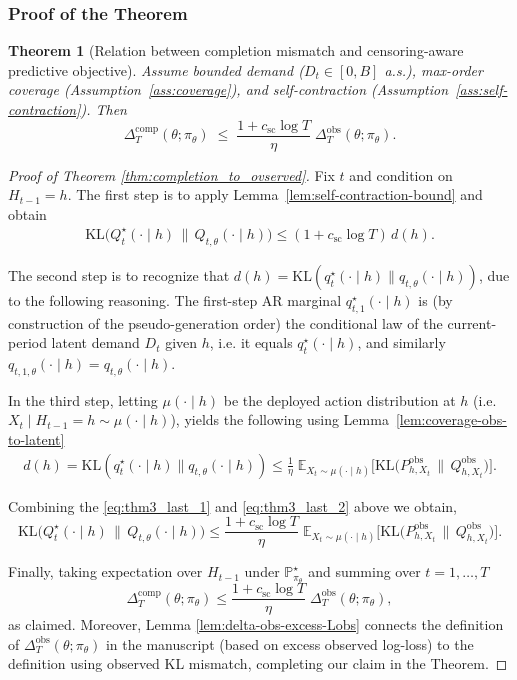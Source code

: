 \documentclass[11pt]{article}
\newtheorem*{theorem*}{Theorem}
\renewcommand{\P}{\mathbb{P}}
\begin{document}
\subsubsection{Proof of the Theorem}

\begin{theorem*}[Relation between completion mismatch and censoring-aware predictive objective]\label{thm:deploy-vs-obs}
Assume bounded demand ($D_t\in[0,B]$ a.s.), max-order coverage (Assumption~\ref{ass:coverage}),
and self-contraction (Assumption~\ref{ass:self-contraction}). Then
\[
\Delta^{\mathrm{comp}}_T(\theta;\pi_\theta)
\;\le\;
\frac{1+c_{\mathrm{sc}}\log T}{\eta}\;
\Delta^{\mathrm{obs}}_T(\theta;\pi_\theta).
\]
\end{theorem*}

\begin{proof}[Proof of Theorem \ref{thm:completion_to_ovserved}]
Fix $t$ and condition on $H_{t-1}=h$. The first step is to apply Lemma~\ref{lem:self-contraction-bound} and obtain
\begin{align}
\label{eq:thm3_last_1}
\mathrm{KL}\big(Q^\star_t(\cdot\mid h)\,\|\,Q_{t,\theta}(\cdot\mid h)\big)
\le (1+c_{\mathrm{sc}}\log T)\, d(h).  
\end{align}


The second step is to recognize that $d(h)=\mathrm{KL}(q_t^\star(\cdot\mid h)\|q_{t,\theta}(\cdot\mid h))$, due to the following reasoning. The first-step AR marginal $q^\star_{t,1}(\cdot\mid h)$ is (by construction of the pseudo-generation order)
the conditional law of the current-period latent demand $D_t$ given $h$, i.e. it equals $q_t^\star(\cdot\mid h)$, and similarly
$q_{t,1,\theta}(\cdot\mid h)=q_{t,\theta}(\cdot\mid h)$. 


In the third step, letting $\mu(\cdot\mid h)$ be the deployed action distribution at $h$ (i.e. $X_t\mid H_{t-1}=h\sim \mu(\cdot\mid h)$), yields the following using Lemma~\ref{lem:coverage-obs-to-latent}
\begin{align}
\label{eq:thm3_last_2}
d(h)=\mathrm{KL}(q_t^\star(\cdot\mid h)\|q_{t,\theta}(\cdot\mid h))
\le \frac{1}{\eta}\;
\mathbb{E}_{X_t\sim \mu(\cdot\mid h)}
\Big[\mathrm{KL}\big(P^{\mathrm{obs}}_{h,X_t}\,\|\,Q^{\mathrm{obs}}_{h,X_t}\big)\Big].
\end{align}

Combining the \eqref{eq:thm3_last_1} and \eqref{eq:thm3_last_2} above we obtain,
\[
\mathrm{KL}\big(Q^\star_t(\cdot\mid h)\,\|\,Q_{t,\theta}(\cdot\mid h)\big)
\le
\frac{1+c_{\mathrm{sc}}\log T}{\eta}\;
\mathbb{E}_{X_t\sim \mu(\cdot\mid h)}
\Big[\mathrm{KL}\big(P^{\mathrm{obs}}_{h,X_t}\,\|\,Q^{\mathrm{obs}}_{h,X_t}\big)\Big].
\]

Finally, taking expectation over $H_{t-1}$ under $\P^\star_{\pi_\theta}$ and summing over $t=1,\dots,T$
\[
\Delta^{\mathrm{comp}}_T(\theta;\pi_\theta)
\le
\frac{1+c_{\mathrm{sc}}\log T}{\eta}\;
\Delta^{\mathrm{obs}}_T(\theta;\pi_\theta),
\]
as claimed. Moreover, Lemma \ref{lem:delta-obs-excess-Lobs} connects the definition of $\Delta^{\mathrm{obs}}_T(\theta;\pi_\theta)$ in the manuscript (based on excess observed log-loss) to the definition using observed KL mismatch, completing our claim in the Theorem.
\end{proof}
\end{document}
